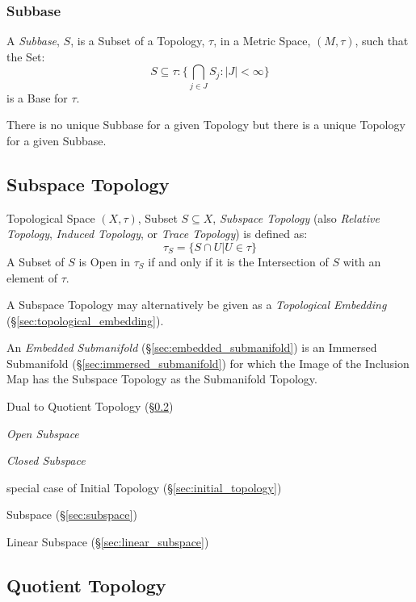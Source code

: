 \subsubsection{Subbase}\label{sec:subbase}

A \emph{Subbase}, $S$, is a Subset of a Topology, $\tau$, in a Metric
Space, $(M,\tau)$, such that the Set:
\[
  S \subseteq \tau : \{ \bigcap_{j \in J} S_j : |J| < \infty \}
\]
is a Base for $\tau$.

There is no unique Subbase for a given Topology but there is a unique
Topology for a given Subbase.



\subsection{Subspace Topology}\label{sec:subspace_topology}

Topological Space $(X,\tau)$, Subset $S \subseteq X$, \emph{Subspace
  Topology} (also \emph{Relative Topology}, \emph{Induced Topology},
or \emph{Trace Topology}) is defined as:
\[
  \tau_S = \{ S \cap U | U \in \tau \}
\]
A Subset of $S$ is Open in $\tau_S$ if and only if it is the
Intersection of $S$ with an element of $\tau$.

A Subspace Topology may alternatively be given as a \emph{Topological
  Embedding} (\S\ref{sec:topological_embedding}).

An \emph{Embedded Submanifold} (\S\ref{sec:embedded_submanifold}) is an
Immersed Submanifold (\S\ref{sec:immersed_submanifold}) for which the Image of
the Inclusion Map has the Subspace Topology as the Submanifold Topology.

Dual to Quotient Topology (\S\ref{sec:quotient_topology})

\emph{Open Subspace}

\emph{Closed Subspace}

special case of Initial Topology (\S\ref{sec:initial_topology})

\fist Subspace (\S\ref{sec:subspace})

\fist Linear Subspace (\S\ref{sec:linear_subspace})



\subsection{Quotient Topology}\label{sec:quotient_topology}

